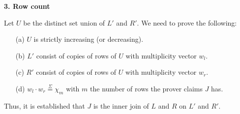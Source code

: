 \documentclass[11pt]{article}
\begin{document}
\textbf{3. Row count}

Let $U$ be the distinct set union of $L'$ and $R'$. We need to prove the following:\\
\begin{enumerate}
\item[(a)] $U$ is strictly increasing (or decreasing).
\item[(b)] $L'$ consist of copies of rows of $U$ with multiplicity vector $w_l$.
\item[(c)] $R'$ consist of copies of rows of $U$ with multiplicity vector $w_r$.
\item[(d)] $w_l \cdot w_r \overset{\Sigma}{=} \chi_m$ with $m$ the number of rows the prover claims $J$ has.
\end{enumerate}

Thus, it is established that $J$ is the inner join of $L$ and $R$ on $L'$ and $R'$.\\
\end{document}
